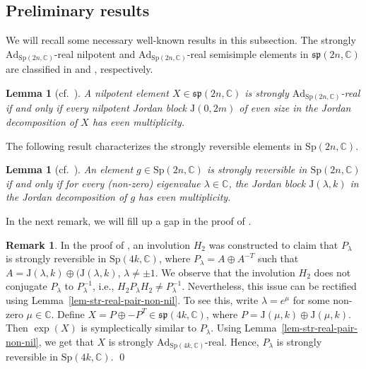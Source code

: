 \documentclass[11pt,reqno]{amsart}
\numberwithin{equation}{section}
\newtheorem{lemma}[theorem]{Lemma}
\theoremstyle{definition}
\newtheorem{remark}[theorem]{Remark}
\def\C{\mathbb C}
\def\C{\mathbb {C}}
\newcommand{\lemref}[1]{Lemma~\ref{#1}}
\begin{document}
\subsection{Preliminary results} We will recall some necessary well-known results in this subsection. The strongly $\mathrm{Ad}_{\mathrm{Sp}(2n,\mathbb{C})}$-real nilpotent  and $\mathrm{Ad}_{\mathrm{Sp}(2n,\mathbb{C})}$-real semisimple elements   in $ \mathfrak{sp}(2n,\mathbb{C})$   are classified in  \cite{GM1} and \cite{GM2}, respectively. 

\begin{lemma}[cf.~{\cite[Theorem 4.9]{GM1}}]\label{lem-str-real-nil-symp-alg}
A nilpotent element $X \in \mathfrak{sp}(2n,\mathbb{C})$ is strongly $\mathrm{Ad}_{\mathrm{Sp}(2n,\mathbb{C})}$-real  if and only if  every nilpotent Jordan block $ \mathrm{J}(0, 2m)$ of even size in the Jordan decomposition of $X$ has even multiplicity.
\end{lemma}

The following result characterizes the strongly reversible elements in $\mathrm{Sp}(2n,\mathbb{C})$. 
\begin{lemma}[cf.~{\cite[Theorem 8]{Cr}}]\label{lem-str-rev-symp-grp}
An element $g \in \mathrm{Sp}(2n,\mathbb{C})$ is strongly reversible in $\mathrm{Sp}(2n,\mathbb{C})$ if and only if for every (non-zero) eigenvalue $\lambda \in \mathbb{C}$, the Jordan block $\mathrm{J}(\lambda, k)$ in the Jordan decomposition of $g$ has even multiplicity.
\end{lemma}


In the next remark, we will fill up a gap in the proof of  \cite[Theorem 8]{Cr}. 
\begin{remark}\label{rem-st-rev-Symp-correction} 
In the proof of \cite[Theorem 8]{Cr},  an involution $H_2$ was constructed to claim that  $P_\lambda$ is strongly reversible in $\mathrm{Sp}(4k,\mathbb{C})$,  where $P_{\lambda} = A \oplus A^{-T} $ such that $A =  \mathrm{J}(\lambda, k) \oplus  (\mathrm{J}(\lambda, k)$,  $\lambda \neq \pm 1$.
We observe that the  involution $H_2$ does not conjugate $ P_{\lambda}$ to $P_{\lambda}^{-1}$, i.e.,  $H_2P_{\lambda}H_2 \not= P^{-1}_{\lambda}$. 
Nevertheless, this issue can be rectified using   \lemref{lem-str-real-pair-non-nil}.  
To see this, write $ \lambda = e^{\mu} $ for some non-zero  $\mu \in \C$. Define $X = P \oplus -P^{T} \in \mathfrak{sp}(4k,\mathbb{C})$, where $P = \mathrm{J}(\mu, k) \oplus \mathrm{J}(\mu, k)$.  Then $\exp(X) $ is symplectically similar to $P_\lambda$.  Using \lemref{lem-str-real-pair-non-nil}, we get that $X$ is strongly $\mathrm{Ad}_{\mathrm{Sp}(4k,\mathbb{C})}$-real. Hence,  $P_\lambda$ is strongly reversible in $\mathrm{Sp}(4k,\mathbb{C})$.  
	\qed
\end{remark}
\end{document}
